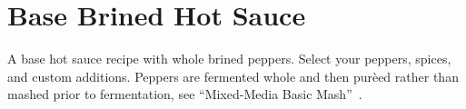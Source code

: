 \section[Brined Hot Sauce]{Base Brined Hot Sauce}\label{base_lacto_brine_hotsauce}

\begin{recipestats}[
        servings=12 \fluidounce,
        preptime=1 \hour,
        bakingtime=2 \week,
        source=Teresi Family,
        original=\citefield{fieryferments2017}{title}~\cite{fieryferments2017},
    ]
\end{recipestats}

\begin{recipeabstract}
    A base hot sauce recipe with whole brined peppers.
    Select your peppers, spices, and custom additions.
    Peppers are fermented whole and then pur\`{e}ed rather than mashed prior to fermentation, see
    ``Mixed-Media Basic Mash''~\cite{fieryferments2017}.
\end{recipeabstract}

\begin{ingredientcolumns}[1]
    \begin{ingredientblock}
        \\
        \\
        \\
    \end{ingredientblock}
    \begin{ingredientblock}
        \\
        \\
        \\
    \end{ingredientblock}
\end{ingredientcolumns}

